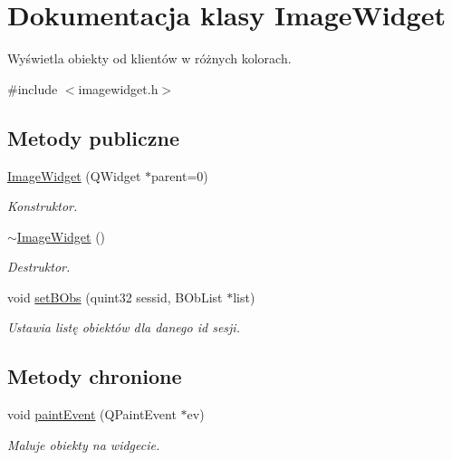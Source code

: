 \hypertarget{class_image_widget}{
\section{Dokumentacja klasy ImageWidget}
\label{class_image_widget}
}


Wyświetla obiekty od klientów w różnych kolorach.  




{\ttfamily \#include $<$imagewidget.h$>$}

\subsection*{Metody publiczne}
\begin{DoxyCompactItemize}
\item 
\hypertarget{class_image_widget_a29f5483569b0ac4abd6b25bb640f9250}{
\hyperlink{class_image_widget_a29f5483569b0ac4abd6b25bb640f9250}{ImageWidget} (QWidget $\ast$parent=0)}
\label{class_image_widget_a29f5483569b0ac4abd6b25bb640f9250}

\begin{DoxyCompactList}\small\item\em Konstruktor. \item\end{DoxyCompactList}\item 
\hypertarget{class_image_widget_ad7ce3e83b4756c1cadb25d27439eea9b}{
\hyperlink{class_image_widget_ad7ce3e83b4756c1cadb25d27439eea9b}{$\sim$ImageWidget} ()}
\label{class_image_widget_ad7ce3e83b4756c1cadb25d27439eea9b}

\begin{DoxyCompactList}\small\item\em Destruktor. \item\end{DoxyCompactList}\item 
void \hyperlink{class_image_widget_aa86269777fd7075bc223a5c8e011252b}{setBObs} (quint32 sessid, BObList $\ast$list)
\begin{DoxyCompactList}\small\item\em Ustawia listę obiektów dla danego id sesji. \item\end{DoxyCompactList}\end{DoxyCompactItemize}
\subsection*{Metody chronione}
\begin{DoxyCompactItemize}
\item 
void \hyperlink{class_image_widget_aea7cb36d8900749ab60d1e097fa1adfb}{paintEvent} (QPaintEvent $\ast$ev)
\begin{DoxyCompactList}\small\item\em Maluje obiekty na widgecie. \item\end{DoxyCompactList}\end{DoxyCompactItemize}


